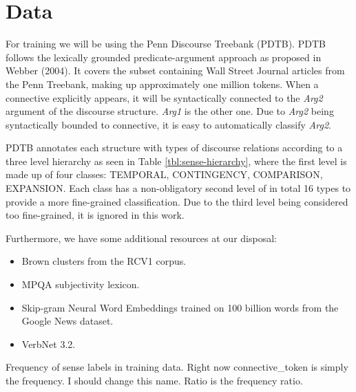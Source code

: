 \chapter{Data}

For training we will be using the Penn Discourse Treebank (PDTB). PDTB follows the lexically grounded predicate-argument approach as proposed in Webber (2004). It covers the subset containing Wall Street Journal articles from the Penn Treebank, making up approximately one million tokens. When a connective explicitly appears, it will be syntactically connected to the \emph{Arg2} argument of the discourse structure. \emph{Arg1} is the other one. Due to \emph{Arg2} being syntactically bounded to connective, it is easy to automatically classify \emph{Arg2}.

PDTB annotates each structure with types of discourse relations according to a three level hierarchy as seen in Table \ref{tbl:sense-hierarchy}, where the first level is made up of four classes: TEMPORAL, CONTINGENCY, COMPARISON, EXPANSION. Each class has a non-obligatory second level of in total 16 types to provide a more fine-grained classification. Due to the third level being considered too fine-grained, it is ignored in this work.

Furthermore, we have some additional resources at our disposal:

\begin{itemize}
    \item Brown clusters from the RCV1 corpus.
    \item MPQA subjectivity lexicon.
    \item Skip-gram Neural Word Embeddings trained on 100 billion words from the Google News dataset.
    \item VerbNet 3.2.
\end{itemize}

\begin{table}

\label{tbl:sense_frequency}
\caption{Frequency of sense labels in training data. Right now connective\_token is simply the frequency. I should change this name. Ratio is the frequency ratio.}
\end{table}
